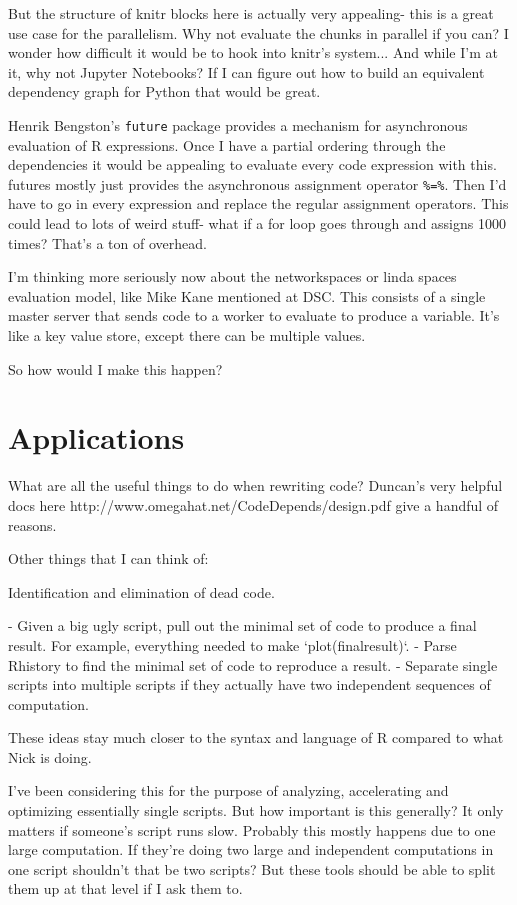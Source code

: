 \documentclass[12pt]{article}
\begin{document}
But the structure of knitr blocks here is actually very appealing- this is
a great use case for the parallelism. Why not evaluate the chunks in
parallel if you can? I wonder how difficult it would be to hook into
knitr's system... And while I'm at it, why not Jupyter Notebooks? If I can
figure out how to build an equivalent dependency graph for Python that
would be great.

Henrik Bengston's \texttt{future} package provides a mechanism for
asynchronous evaluation of R expressions. Once I have a partial ordering
through the dependencies it
would be appealing to evaluate every code expression with this. 
futures mostly just provides the asynchronous
assignment operator \texttt{\%=\%}. Then I'd have to go in every
expression and replace the regular assignment operators. This could lead to
lots of weird stuff- what if a for loop goes through and assigns 1000
times? That's a ton of overhead.

I'm thinking more seriously now about the networkspaces or linda spaces
evaluation model, like Mike Kane mentioned at DSC. This consists of a
single master server that sends code to a worker to evaluate to produce a
variable. It's like a key value store, except there can be multiple values.

So how would I make this happen?


\section{Applications}

What are all the useful things to do when rewriting code?  Duncan's very
helpful docs here http://www.omegahat.net/CodeDepends/design.pdf give a
handful of reasons.

Other things that I can think of:

Identification and elimination of dead code.

- Given a big ugly script, pull out the minimal set of code to produce a
  final result. For example, everything needed to make `plot(finalresult)`.
- Parse Rhistory to find the minimal set of code to reproduce a result.
- Separate single scripts into multiple scripts if they actually have two
  independent sequences of computation.

These ideas stay much closer to the syntax and language of R compared to
what Nick is doing.

I've been considering this for the purpose of analyzing, accelerating and
optimizing essentially single scripts. But how important is this generally?
It only matters if someone's script runs slow. Probably this mostly happens
due to one large computation. If they're doing two large and independent
computations in one script shouldn't that be two scripts? But these tools
should be able to split them up at that level if I ask them to.
\end{document}
